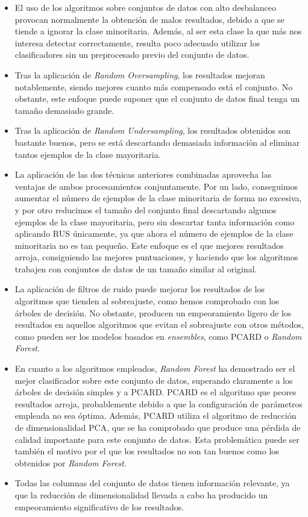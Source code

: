 \documentclass[
  a4paper,
,tablecaptionabove
]{scrartcl}
\providecommand{\tightlist}{%
  \setlength{\itemsep}{0pt}\setlength{\parskip}{0pt}}
\begin{document}
\begin{itemize}
\tightlist
\item
  El uso de los algoritmos sobre conjuntos de datos con alto desbalanceo
  provocan normalmente la obtención de malos resultados, debido a que se
  tiende a ignorar la clase minoritaria. Además, al ser esta clase la
  que más nos interesa detectar correctamente, resulta poco adecuado
  utilizar los clasificadores sin un preprocesado previo del conjunto de
  datos.
\item
  Tras la aplicación de \emph{Random Oversampling}, los resultados
  mejoran notablemente, siendo mejores cuanto más compensado está el
  conjunto. No obstante, este enfoque puede suponer que el conjunto de
  datos final tenga un tamaño demasiado grande.
\item
  Tras la aplicación de \emph{Random Undersampling}, los resultados
  obtenidos son bastante buenos, pero se está descartando demasiada
  información al eliminar tantos ejemplos de la clase mayoritaria.
\item
  La aplicación de las dos técnicas anteriores combinadas aprovecha las
  ventajas de ambos procesamientos conjuntamente. Por un lado,
  conseguimos aumentar el número de ejemplos de la clase minoritaria de
  forma no excesiva, y por otro reducimos el tamaño del conjunto final
  descartando algunos ejemplos de la clase mayoritaria, pero sin
  descartar tanta información como aplicando RUS únicamente, ya que
  ahora el número de ejemplos de la clase minoritaria no es tan pequeño.
  Este enfoque es el que mejores resultados arroja, consiguiendo las
  mejores puntuaciones, y haciendo que los algoritmos trabajen con
  conjuntos de datos de un tamaño similar al original.
\item
  La aplicación de filtros de ruido puede mejorar los resultados de los
  algoritmos que tienden al sobreajuste, como hemos comprobado con los
  árboles de decisión. No obstante, producen un empeoramiento ligero de
  los resultados en aquellos algoritmos que evitan el sobreajuste con
  otros métodos, como pueden ser los modelos basados en
  \emph{ensembles}, como PCARD o \emph{Random Forest}.
\item
  En cuanto a los algoritmos empleados, \emph{Random Forest} ha
  demostrado ser el mejor clasificador sobre este conjunto de datos,
  superando claramente a los árboles de decisión simples y a PCARD.
  PCARD es el algoritmo que peores resultados arroja, probablemente
  debido a que la configuración de parámetros empleada no sea óptima.
  Además, PCARD utiliza el algoritmo de reducción de dimensionalidad
  PCA, que se ha comprobado que produce una pérdida de calidad
  importante para este conjunto de datos. Esta problemática puede ser
  también el motivo por el que los resultados no son tan buenos como los
  obtenidos por \emph{Random Forest}.
\item
  Todas las columnas del conjunto de datos tienen información relevante,
  ya que la reducción de dimensionalidad llevada a cabo ha producido un
  empeoramiento significativo de los resultados.
\end{itemize}
\end{document}
